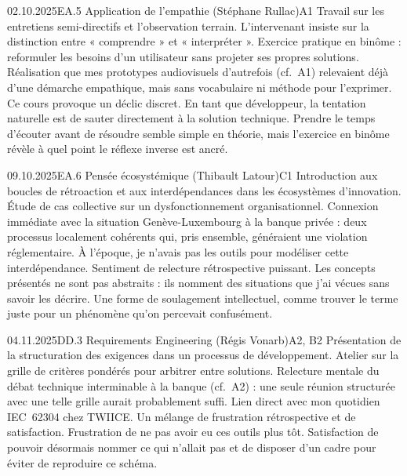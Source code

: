 \begin{jbentry}{02.10.2025}{EA.5 Application de l'empathie (Stéphane Rullac)}{A1}
\jbobs
Travail sur les entretiens semi-directifs et l'observation terrain. L'intervenant insiste sur la distinction entre « comprendre » et « interpréter ». Exercice pratique en binôme : reformuler les besoins d'un utilisateur sans projeter ses propres solutions. Réalisation que mes prototypes audiovisuels d'autrefois (cf.~A1) relevaient déjà d'une démarche empathique, mais sans vocabulaire ni méthode pour l'exprimer.
\jbres
Ce cours provoque un déclic discret. En tant que développeur, la tentation naturelle est de sauter directement à la solution technique. Prendre le temps d'écouter avant de résoudre semble simple en théorie, mais l'exercice en binôme révèle à quel point le réflexe inverse est ancré.
\end{jbentry}

\begin{jbentry}{09.10.2025}{EA.6 Pensée écosystémique (Thibault Latour)}{C1}
\jbobs
Introduction aux boucles de rétroaction et aux interdépendances dans les écosystèmes d'innovation. Étude de cas collective sur un dysfonctionnement organisationnel. Connexion immédiate avec la situation Genève-Luxembourg à la banque privée : deux processus localement cohérents qui, pris ensemble, généraient une violation réglementaire. À l'époque, je n'avais pas les outils pour modéliser cette interdépendance.
\jbres
Sentiment de relecture rétrospective puissant. Les concepts présentés ne sont pas abstraits : ils nomment des situations que j'ai vécues sans savoir les décrire. Une forme de soulagement intellectuel, comme trouver le terme juste pour un phénomène qu'on percevait confusément.
\end{jbentry}

\begin{jbentry}{04.11.2025}{DD.3 Requirements Engineering (Régis Vonarb)}{A2, B2}
\jbobs
Présentation de la structuration des exigences dans un processus de développement. Atelier sur la grille de critères pondérés pour arbitrer entre solutions. Relecture mentale du débat technique interminable à la banque (cf.~A2) : une seule réunion structurée avec une telle grille aurait probablement suffi. Lien direct avec mon quotidien IEC~62304 chez TWIICE.
\jbres
Un mélange de frustration rétrospective et de satisfaction. Frustration de ne pas avoir eu ces outils plus tôt. Satisfaction de pouvoir désormais nommer ce qui n'allait pas et de disposer d'un cadre pour éviter de reproduire ce schéma.
\end{jbentry}

